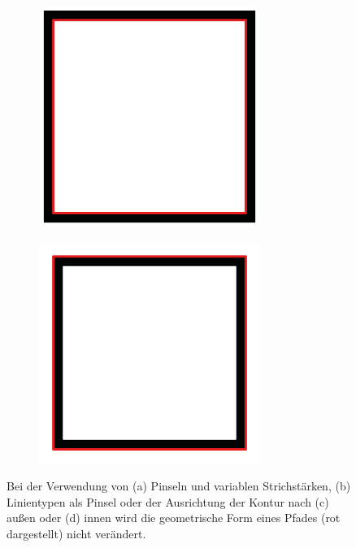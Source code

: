 \begin{figure}[h!tbp]
\begin{subfigure}{.23\textwidth}
  \caption{}
\end{subfigure}%
\begin{subfigure}{.23\textwidth}
  \centering
  \includegraphics[width=.8\linewidth]{bilder/vektor_pfadLayoutattributeErweitertC.pdf}
  \caption{}
\end{subfigure}%
\begin{subfigure}{.23\textwidth}
  \centering
  \includegraphics[width=.8\linewidth]{bilder/vektor_pfadLayoutattributeErweitertD.pdf}
  \caption{}
\end{subfigure}
\caption{Bei der Verwendung von (a) Pinseln und variablen Strichstärken, (b) Linientypen als Pinsel oder der Ausrichtung der Kontur nach (c) außen oder (d) innen wird die geometrische Form eines Pfades (rot dargestellt) nicht verändert.}
\label{abb:vektor_pfadLayoutattributeErweitert}
\end{figure}

